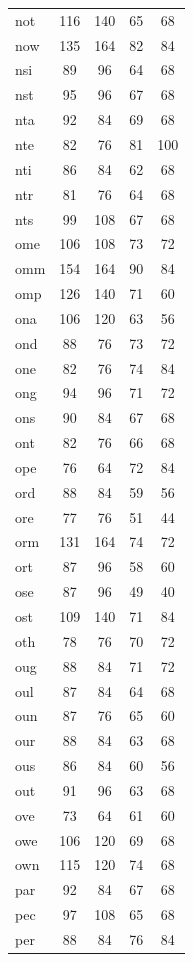 \documentclass[ms,electronic,twosidetoc,letterpaper,chaptercenter,parttop,lof,lot]{byumsphd}
\begin{document}
\begin{table}
\begin{tabular}{| l | c c | c c |}
  not & 116 & 140 & 65 & 68 \\
  now & 135 & 164 & 82 & 84 \\
  nsi & 89 & 96 & 64 & 68 \\
  nst & 95 & 96 & 67 & 68 \\
  nta & 92 & 84 & 69 & 68 \\
  nte & 82 & 76 & 81 & 100 \\
  nti & 86 & 84 & 62 & 68 \\
  ntr & 81 & 76 & 64 & 68 \\
  nts & 99 & 108 & 67 & 68 \\
  ome & 106 & 108 & 73 & 72 \\
  omm & 154 & 164 & 90 & 84 \\
  omp & 126 & 140 & 71 & 60 \\
  ona & 106 & 120 & 63 & 56 \\
  ond & 88 & 76 & 73 & 72 \\
  one & 82 & 76 & 74 & 84 \\
  ong & 94 & 96 & 71 & 72 \\
  ons & 90 & 84 & 67 & 68 \\
  ont & 82 & 76 & 66 & 68 \\
  ope & 76 & 64 & 72 & 84 \\
  ord & 88 & 84 & 59 & 56 \\
  ore & 77 & 76 & 51 & 44 \\
  orm & 131 & 164 & 74 & 72 \\
  ort & 87 & 96 & 58 & 60 \\
  ose & 87 & 96 & 49 & 40 \\
  ost & 109 & 140 & 71 & 84 \\
  oth & 78 & 76 & 70 & 72 \\
  oug & 88 & 84 & 71 & 72 \\
  oul & 87 & 84 & 64 & 68 \\
  oun & 87 & 76 & 65 & 60 \\
  our & 88 & 84 & 63 & 68 \\
  ous & 86 & 84 & 60 & 56 \\
  out & 91 & 96 & 63 & 68 \\
  ove & 73 & 64 & 61 & 60 \\
  owe & 106 & 120 & 69 & 68 \\
  own & 115 & 120 & 74 & 68 \\
  par & 92 & 84 & 67 & 68 \\
  pec & 97 & 108 & 65 & 68 \\
  per & 88 & 84 & 76 & 84 \\

\end{tabular}
\end{table}
\end{document}
